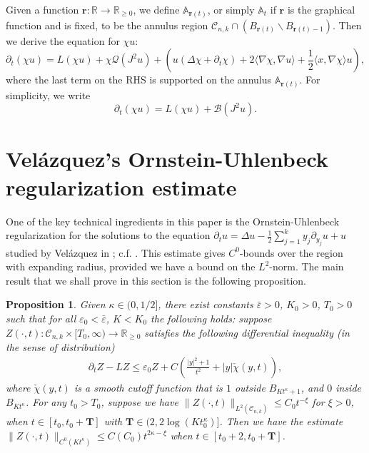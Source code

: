 \documentclass[11pt]{amsart}
\numberwithin{equation}{section}
\newtheorem{proposition}[theorem]{Proposition}
\numberwithin{equation}{section}
\newcommand{\eps}{\varepsilon}
\newcommand{\br}{\mathbf{r}}
\newcommand{\cB}{\mathcal{B}}
\newcommand{\cC}{\mathcal{C}}
\newcommand{\cQ}{\mathcal{Q}}
\newcommand{\R}{\mathbb{R}}
\newcommand{\A}{\mathbb{A}}
\newcommand{\pr}{\partial}
\begin{document}
	Given a function $\mathbf{r}:\R\to\R_{\geq 0}$, we define $\mathbb A_{\mathbf r(t)}$, or simply $\A_t$ if $\mathbf{r}$ is the graphical function and is fixed, to be the annulus region $\cC_{n,k}\cap(B_{\br(t)}\backslash B_{\br(t)-1})$. Then we derive the equation for $\chi u$:
	\begin{equation}\label{EqCutOff}
		\pr_t (\chi u)
		=
		L(\chi u)+\chi\cQ(J^2u)+(u(\Delta\chi+\pr_t\chi)+2\langle \nabla\chi,\nabla u\rangle +\frac{1}{2}\langle x,\nabla \chi\rangle u),
	\end{equation}
	where the last term on the RHS is supported on the annulus $\mathbb A_{\mathbf r(t)}$. For simplicity, we write
	\begin{equation}\label{Eq}
		\pr_t (\chi u)
		=
		L(\chi u)+\cB(J^2u).
	\end{equation}
	
	
	
	
	\section{Vel\'azquez's Ornstein-Uhlenbeck regularization estimate}\label{S_OU_Estimate}
	
	One of the key technical ingredients in this paper is the Ornstein-Uhlenbeck regularization for the solutions to the equation $\pr_t u=\Delta u-\frac{1}{2}\sum_{j=1}^k y_j \pr_{y_j}u+u$ studied by Vel\'azquez in \cite{V1}; c.f. \cite{HV1,HV2}. This estimate gives $C^0$-bounds over the region with expanding radius, provided we have a bound on the $L^2$-norm. The main result that we shall prove in this section is the following proposition. 
	\begin{proposition}\label{PropVelazquez}
		Given $\kappa \in (0,1/2]$, there exist constants $\bar\eps>0$, $K_0>0$, $T_0>0$ such that for all $\eps_0<\bar \eps$, $K<K_0$ the following holds: suppose  $Z(\cdot,t):\cC_{n,k}\times[T_0,\infty)\to\R_{\geq 0}$ satisfies the following differential inequality (in the sense of distribution) \begin{equation}\label{EqVelazInequality}
			\begin{split}
				\pr_t Z-L Z
				\leq
				\eps_0 Z+C\left(\frac{|y|^2+1}{t^2}+|y|\check\chi(y,t)\right),
			\end{split} 
		\end{equation}
		where $\check\chi(y,t)$ is a smooth cutoff function that is $1$ outside $B_{Kt^{\kappa}+1}$, and $0$ inside $B_{Kt^{\kappa}}$.
		For any $t_0>T_0$, suppose we have $ \|Z(\cdot,t)\|_{L^2(\cC_{n,k})}\leq C_0t^{-\xi}$ for $\xi>0$, when $t\in[t_0,t_0+\mathbf{T}]$ with $\mathbf{T}\in(2,2\log(K t_0^\kappa)]$. Then we have the estimate 
		$\|Z(\cdot,t)\|_{C^0(Kt^\kappa)}\leq C(C_0)t^{2\kappa-\xi}$ when $t\in[t_0+2,t_0+\mathbf{T}]$. 
	\end{proposition}
	
\end{document}
